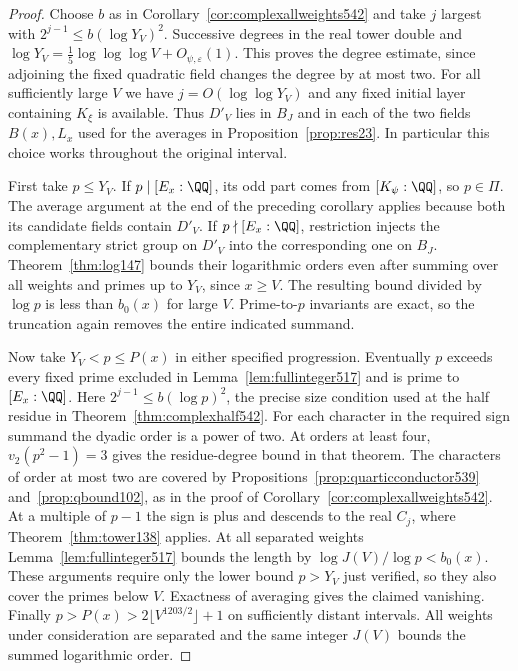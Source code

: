 \documentclass[a4paper,11pt]{article}
\theoremstyle{definition}
\theoremstyle{remark}
\numberwithin{equation}{section}
\begin{document}
\begin{proof}
Choose \(b\) as in Corollary~\ref{cor:complexallweights542}
and take \(j\) largest with \(2^{j-1}\le b(\log Y_V)^2\).
Successive degrees in the real tower double and
\(\log Y_V=\tfrac15\log\log\log V+O_{\psi,\varepsilon}(1)\).
This proves the degree estimate, since adjoining the fixed
quadratic field changes the degree by at most two.
For all sufficiently large \(V\) we have
\(j=O(\log\log Y_V)\) and any fixed initial layer containing
\(K_\xi\) is available. Thus \(D'_V\) lies in \(B_J\) and
in each of the two fields \(B(x),L_x\) used for the
averages in Proposition~\ref{prop:res23}. In particular this
choice works throughout the original interval.

First take \(p\le Y_V\). If \(p\mid[E_x:\QQ]\), its odd
part comes from \([K_\psi:\QQ]\), so \(p\in\Pi\). The average
argument at the end of the preceding corollary applies
because both its candidate fields contain \(D'_V\).
If \(p\nmid[E_x:\QQ]\), restriction injects the complementary
strict group on \(D'_V\) into the corresponding one on
\(B_J\). Theorem~\ref{thm:log147} bounds their logarithmic
orders even after summing over all weights and primes up to
\(Y_V\), since \(x\ge V\). The resulting bound divided by
\(\log p\) is less than \(b_0(x)\) for large \(V\).
Prime-to-\(p\) invariants are exact, so the truncation again
removes the entire indicated summand.

Now take \(Y_V<p\le P(x)\) in either specified progression.
Eventually \(p\) exceeds every fixed prime excluded in
Lemma~\ref{lem:fullinteger517} and is prime to \([E_x:\QQ]\).
Here \(2^{j-1}\le b(\log p)^2\), the precise size condition
used at the half residue in Theorem~\ref{thm:complexhalf542}.
For each character in the required sign summand the dyadic
order is a power of two. At orders at least four,
\(v_2(p^2-1)=3\) gives the residue-degree bound in that
theorem. The characters of order at most two are covered by
Propositions~\ref{prop:quarticconductor539}
and~\ref{prop:qbound102}, as in the proof of
Corollary~\ref{cor:complexallweights542}. At a multiple of
\(p-1\) the sign is plus and descends to the real \(C_j\),
where Theorem~\ref{thm:tower138} applies. At all separated
weights Lemma~\ref{lem:fullinteger517} bounds the length by
\(\log J(V)/\log p<b_0(x)\). These arguments require only
the lower bound \(p>Y_V\) just verified, so they also cover
the primes below \(V\). Exactness of averaging gives the
claimed vanishing. Finally \(p>P(x)>2\lfloor
V^{1203/2}\rfloor+1\) on sufficiently distant intervals.
All weights under consideration are separated and the same
integer \(J(V)\) bounds the summed logarithmic order.
\end{proof}
\end{document}

